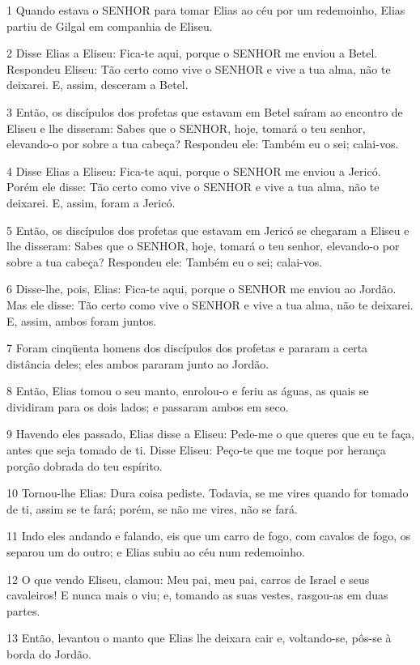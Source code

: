 \par 1 Quando estava o SENHOR para tomar Elias ao céu por um redemoinho, Elias partiu de Gilgal em companhia de Eliseu.
\par 2 Disse Elias a Eliseu: Fica-te aqui, porque o SENHOR me enviou a Betel. Respondeu Eliseu: Tão certo como vive o SENHOR e vive a tua alma, não te deixarei. E, assim, desceram a Betel.
\par 3 Então, os discípulos dos profetas que estavam em Betel saíram ao encontro de Eliseu e lhe disseram: Sabes que o SENHOR, hoje, tomará o teu senhor, elevando-o por sobre a tua cabeça? Respondeu ele: Também eu o sei; calai-vos.
\par 4 Disse Elias a Eliseu: Fica-te aqui, porque o SENHOR me enviou a Jericó. Porém ele disse: Tão certo como vive o SENHOR e vive a tua alma, não te deixarei. E, assim, foram a Jericó.
\par 5 Então, os discípulos dos profetas que estavam em Jericó se chegaram a Eliseu e lhe disseram: Sabes que o SENHOR, hoje, tomará o teu senhor, elevando-o por sobre a tua cabeça? Respondeu ele: Também eu o sei; calai-vos.
\par 6 Disse-lhe, pois, Elias: Fica-te aqui, porque o SENHOR me enviou ao Jordão. Mas ele disse: Tão certo como vive o SENHOR e vive a tua alma, não te deixarei. E, assim, ambos foram juntos.
\par 7 Foram cinqüenta homens dos discípulos dos profetas e pararam a certa distância deles; eles ambos pararam junto ao Jordão.
\par 8 Então, Elias tomou o seu manto, enrolou-o e feriu as águas, as quais se dividiram para os dois lados; e passaram ambos em seco.
\par 9 Havendo eles passado, Elias disse a Eliseu: Pede-me o que queres que eu te faça, antes que seja tomado de ti. Disse Eliseu: Peço-te que me toque por herança porção dobrada do teu espírito.
\par 10 Tornou-lhe Elias: Dura coisa pediste. Todavia, se me vires quando for tomado de ti, assim se te fará; porém, se não me vires, não se fará.
\par 11 Indo eles andando e falando, eis que um carro de fogo, com cavalos de fogo, os separou um do outro; e Elias subiu ao céu num redemoinho.
\par 12 O que vendo Eliseu, clamou: Meu pai, meu pai, carros de Israel e seus cavaleiros! E nunca mais o viu; e, tomando as suas vestes, rasgou-as em duas partes.
\par 13 Então, levantou o manto que Elias lhe deixara cair e, voltando-se, pôs-se à borda do Jordão.
